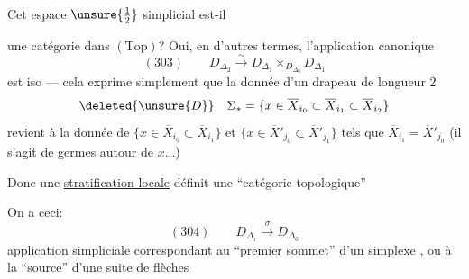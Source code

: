 Cet espace $\unsure{\tfrac12}$ simplicial est-il



une catégorie dans $(\mathrm{Top})$? Oui, en d'autres termes, l'application canonique
\[
(303)\qquad D_{\Delta_2}\xrightarrow{\sim}D_{\Delta_1}\mathbin{\times}_{D_{\Delta_0}}D_{\Delta_1}
\]
est iso --- cela exprime simplement que la donnée d'un drapeau  de longueur $2$
\[
\deleted{\unsure{D}}\quad \Sigma_* = \{x\in\overline X_{i_0}\subset\overline X_{i_1}\subset\overline X_{i_2}\}
\]
revient à la donnée de $\{x\in\overline X_{i_0}\subset\overline X_{i_1}\}$ et $\{x\in\overline X'_{j_0}\subset\overline X'_{j_1}\}$ tels que $\overline X_{i_1}=\overline X'_{j_0}$ (il s'agit de germes autour de $x$...)

Donc une \uline{stratification locale} définit une ``catégorie topologique''
\diagram{
\[
(303)\quad\left\{
\begin{array}{l}
\text{espace des objets} = D_{\Delta_0} \\
\hspace{5em}=\text{espace des strates locales}\\
\hspace{7em}\deleted{\unsure{s}}\ \text{pas strictes}\\[.8em]
\text{espace des flèches} = D_{\Delta_1}\\
\hspace{5em}=\text{espace des drapeaux}\\
\hspace{7em}x\in\overline X_{i_0}\subset\overline X_{i_1}\\[.8em]
\text{\uline{morphismes} ``source'', ``but'', ``\unsure{composition|multiplication}''}\\
\hspace{4em}\text{définis de façon évidente}
\end{array}\right.
\]
}



On a ceci:
\[
(304)\qquad D_{\Delta_r}\xrightarrow{\sigma}D_{\Delta_0}
\]
application simpliciale correspondant au ``premier sommet'' d'un simplexe , ou à la ``source'' d'une suite de flèches
\diagram{\begin{tikzcd}[ampersand replacement=\&,column sep=small]
\bullet \arrow[r,dash] \& \bullet \arrow[r] \& \bullet \arrow[r] \& \cdots \arrow[r] \& \bullet
\end{tikzcd}}

